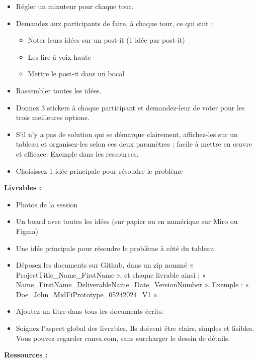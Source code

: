 \begin{itemize}
\begin{itemize}
\item Régler un minuteur pour chaque tour.
\item Demandez aux participants de faire, à chaque tour, ce qui suit :
\begin{itemize}
\item Noter leurs idées sur un post-it (1 idée par post-it)
\item Les lire à voix haute
\item Mettre le post-it dans un bocal
\end{itemize}
\item Rassembler toutes les idées.
\item Donnez 3 stickers à chaque participant et demandez-leur de voter pour les trois meilleures options.
\item S'il n'y a pas de solution qui se démarque clairement, affichez-les sur un tableau et organisez-les selon ces deux paramètres : facile à mettre en œuvre et efficace. Exemple dans les ressources.
\item Choisissez 1 idée principale pour résoudre le problème
\end{itemize}
\end{itemize}

\textbf{Livrables :}

\begin{itemize}
\item Photos de la session
\item Un board avec toutes les idées (sur papier ou en numérique sur Miro ou Figma)
\item Une idée principale pour résoudre le problème à côté du tableau
\item Déposez les documents sur Github, dans un zip nommé « ProjectTitle\_Name\_FirstName », et chaque livrable ainsi : « Name\_FirstName\_DeliverableName\_Date\_VersionNumber ». Exemple : « Doe\_John\_MidFiPrototype\_05242024\_V1 ».
\item Ajoutez un titre dans tous les documents écrits.
\item Soignez l'aspect global des livrables. Ils doivent être clairs, simples et lisibles. Vous pouvez regarder canva.com, sans surcharger le dessin de détails.
\end{itemize}

\textbf{Ressources :}

